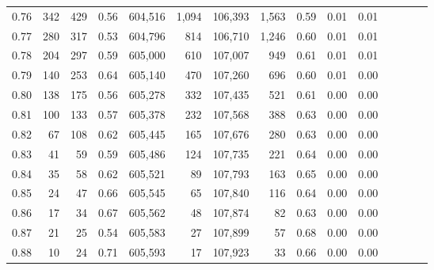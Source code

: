 \begin{tabular}{rrrcrrrrrrrrrrr}
0.76 &     342 &    429 &                                       0.56 &  604,516 &    1,094 &  106,393 &    1,563 &  0.59 &  0.01 &                         0.01 \\
0.77 &     280 &    317 &                                       0.53 &  604,796 &      814 &  106,710 &    1,246 &  0.60 &  0.01 &                         0.01 \\
0.78 &     204 &    297 &                                       0.59 &  605,000 &      610 &  107,007 &      949 &  0.61 &  0.01 &                         0.01 \\
0.79 &     140 &    253 &                                       0.64 &  605,140 &      470 &  107,260 &      696 &  0.60 &  0.01 &                         0.00 \\
0.80 &     138 &    175 &                                       0.56 &  605,278 &      332 &  107,435 &      521 &  0.61 &  0.00 &                         0.00 \\
0.81 &     100 &    133 &                                       0.57 &  605,378 &      232 &  107,568 &      388 &  0.63 &  0.00 &                         0.00 \\
0.82 &      67 &    108 &                                       0.62 &  605,445 &      165 &  107,676 &      280 &  0.63 &  0.00 &                         0.00 \\
0.83 &      41 &     59 &                                       0.59 &  605,486 &      124 &  107,735 &      221 &  0.64 &  0.00 &                         0.00 \\
0.84 &      35 &     58 &                                       0.62 &  605,521 &       89 &  107,793 &      163 &  0.65 &  0.00 &                         0.00 \\
0.85 &      24 &     47 &                                       0.66 &  605,545 &       65 &  107,840 &      116 &  0.64 &  0.00 &                         0.00 \\
0.86 &      17 &     34 &                                       0.67 &  605,562 &       48 &  107,874 &       82 &  0.63 &  0.00 &                         0.00 \\
0.87 &      21 &     25 &                                       0.54 &  605,583 &       27 &  107,899 &       57 &  0.68 &  0.00 &                         0.00 \\
0.88 &      10 &     24 &                                       0.71 &  605,593 &       17 &  107,923 &       33 &  0.66 &  0.00 &                         0.00 \\

\end{tabular}
